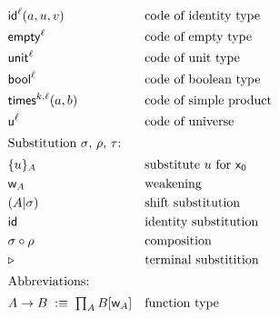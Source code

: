 \begin{align*}
 & \uniId{\ell}{a}{u}{v} &&\text{code of identity type} \\
 & \uniEmpty{\ell} &&\text{code of empty type} \\
 & \uniUnit{\ell} &&\text{code of unit type} \\
 & \uniBool{\ell} &&\text{code of boolean type} \\
 & \uniSimProd{k}{\ell}{a}{b} &&\text{code of simple product} \\
 & \uniUni{\ell} &&\text{code of universe} \\
%
\intertext{Substitution $\sigma$, $\rho$, $\tau$:}
%
 & \sbzero{A}{u} &&\text{substitute $u$ for $\var{0}$} \\
 & \sbweak{A} &&\text{weakening} \\
 & \sbshift{\sigma}{A} &&\text{shift substitution} \\
 & \sbid &&\text{identity substitution} \\
 & \sbcomp{\sigma}{\rho} &&\text{composition} \\
 & \sbterminal &&\text{terminal substitition} \\
%
\intertext{Abbreviations:}
%
  &A \to B \defequiv \Prod{A}{\Subst{B}{\sbweak{A}}} &&\text{function type}
\end{align*}
